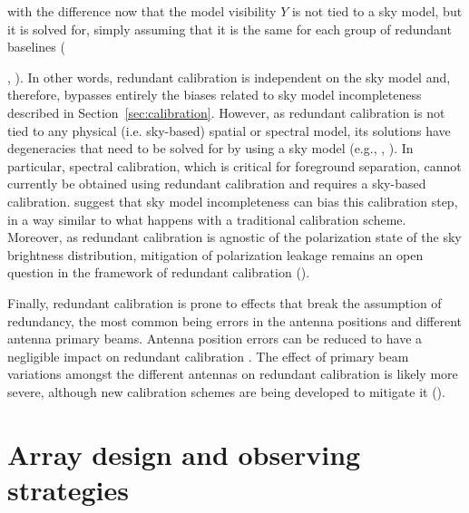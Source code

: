 with the difference now that the model visibility $Y$ is not tied to a sky model, but it is solved for, simply assuming that it is the same for each group of redundant baselines ({\cite{wieringa92}, \cite{liu10}). In other words, redundant calibration is independent on the sky model and, therefore, bypasses entirely the biases related to sky model incompleteness described in Section~\ref{sec:calibration}. However, as redundant calibration is not tied to any physical (i.e. sky-based) spatial or spectral model, its solutions have degeneracies that need to be solved for by using a sky model (e.g., \cite{zheng14}, \cite{byrne19}). In particular, spectral calibration, which is critical for foreground separation, cannot currently be obtained using redundant calibration and requires a sky-based calibration. \cite{byrne19} suggest that sky model incompleteness can bias this calibration step, in a way similar to what happens with a traditional calibration scheme. Moreover, as redundant calibration is agnostic of the polarization state of the sky brightness distribution, mitigation of polarization leakage remains an open question in the framework of redundant calibration (\cite{dillon18}). 

Finally, redundant calibration is prone to effects that break the assumption of redundancy, the most common being errors in the antenna positions and different antenna primary beams. Antenna position errors can be reduced to have a negligible impact on redundant calibration \cite{joseph18}. The effect of primary beam variations amongst the different antennas on redundant calibration is likely more severe, although new calibration schemes are being developed to mitigate it (\cite{orosz19}).



\section{Array design and observing strategies}
\label{sec:design}

}
